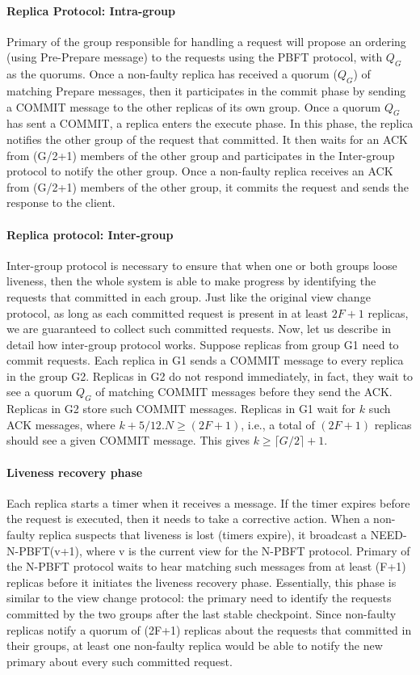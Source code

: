 \documentclass[twocolumn,10pt]{article}
\begin{document}
\paragraph{Replica Protocol: Intra-group} Primary of the group responsible for handling a request 
will propose an ordering (using Pre-Prepare message) to the requests using the PBFT protocol, with $Q_G$ as the quorums. Once a non-faulty replica has received a quorum ($Q_G$) of matching Prepare messages, then it participates in the commit phase
by sending a COMMIT message to the other replicas of its own group. Once a quorum $Q_G$ has sent a COMMIT,
a replica enters the execute phase. In this phase, the replica notifies the other group of the request that committed. 
It then waits for an ACK from (G/2+1) members of the other group and 
participates in the Inter-group protocol to notify the other group. Once a non-faulty replica receives an
ACK from (G/2+1) members of the other group, it commits the request and sends the response to the client. 


\paragraph{Replica protocol: Inter-group} Inter-group protocol is necessary to ensure that when one or both
groups loose liveness, then the whole system is able to make progress by identifying the requests that committed
in each group. Just like the original view change protocol, as long as each committed request is present in at least
$2F+1$ replicas, we are guaranteed to collect such committed requests. Now, let us describe in detail how inter-group protocol works.
Suppose replicas from group G1 need to commit requests. Each replica in G1 sends a COMMIT message to every
replica in the group G2. Replicas in G2 do not respond immediately, in fact, they wait to see a quorum $Q_G$ of matching
COMMIT messages before they send the ACK. Replicas in G2 store such COMMIT messages. 
Replicas in G1 wait for $k$ such ACK messages, where $k+5/12.N \ge (2F+1)$, i.e., a total of $(2F+1)$ replicas should see a 
given COMMIT message. This gives $k\ge\lceil G/2 \rceil+1$.


\paragraph{Liveness recovery phase} Each replica starts a timer when it receives a message. If the timer expires before the
request is executed, then it needs to take a corrective action. When a
non-faulty replica suspects that liveness is lost (timers expire), it broadcast a NEED-N-PBFT(v+1), where v is the current
view for the N-PBFT protocol. Primary of the N-PBFT
protocol waits to hear matching such messages from at least (F+1) replicas before it initiates the liveness recovery phase. Essentially,
this phase is similar to the view change protocol: the primary need to identify the requests committed by the two groups after the last
stable checkpoint. Since non-faulty replicas notify a quorum of (2F+1) replicas about the requests that committed in their groups, at 
least one non-faulty replica would be able to notify the new primary about every such committed request.   
\end{document}

